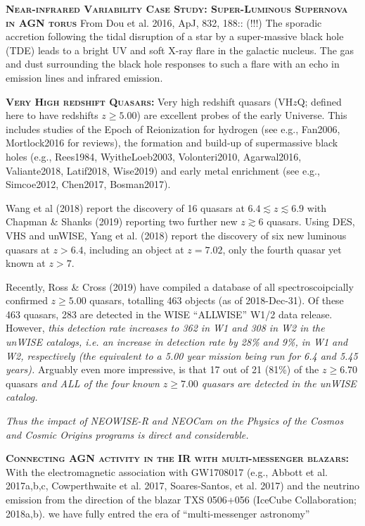 \documentclass[12pt]{article}
\begin{document}
\smallskip
\smallskip
\noindent
\textbf{\textsc{Near-infrared Variability Case Study: Super-Luminous Supernova in AGN torus}} 
From Dou et al. 2016, ApJ, 832, 188:: (!!!) 
The sporadic accretion following the tidal disruption of a star by a
super-massive black hole (TDE) leads to a bright UV and soft X-ray
flare in the galactic nucleus. The gas and dust surrounding the black
hole responses to such a flare with an echo in emission lines and
infrared emission.

\smallskip
\smallskip
\noindent
\textbf{\textsc{Very High redshift Quasars:}} 
Very high redshift quasars (VH$z$Q; defined here to have redshifts $z\geq5.00$) are excellent probes of the early Universe. This includes studies of the Epoch of Reionization for hydrogen (see e.g., Fan2006, Mortlock2016 for reviews), the formation and build-up of supermassive black holes (e.g., Rees1984, WyitheLoeb2003, Volonteri2010, Agarwal2016, Valiante2018, Latif2018, Wise2019) and early metal enrichment (see e.g., Simcoe2012, Chen2017, Bosman2017).

\smallskip
\smallskip
\noindent
Wang et al (2018) 
report the discovery of 16 quasars at $6.4\lesssim z \lesssim 6.9$ 
with Chapman \& Shanks (2019) reporting two further new $z\gtrsim6$ quasars. 
Using DES, VHS and unWISE, Yang et al. (2018) report the discovery of six new luminous quasars at $z > 6.4$, 
including an object at $z = 7.02$, only the fourth quasar yet known at $z > 7$. 

\smallskip
\smallskip
\noindent
Recently, Ross \& Cross (2019) have compiled a database of all 
spectroscoipcially confirmed $z\geq5.00$ quasars, totalling 463 objects (as of 
2018-Dec-31). Of these 463 quasars, 283 are detected in the WISE ``ALLWISE'' W1/2 
data release. However, {\it this detection rate increases to 362 in W1 and 308 in W2 
in the unWISE catalogs, i.e. an increase in detection rate by 28\% and 9\%, in W1 and W2, 
respectively (the equivalent to a 5.00 year mission being run for 6.4 and 5.45 years).}
Arguably even more impressive, is that 17  out of  21 (81\%) of the $z\geq6.70$
quasars {\it and ALL of the four known $z\geq7.00$ quasars are detected in the 
unWISE catalog.}

\smallskip
\smallskip
\noindent
{\it Thus the impact of NEOWISE-R and NEOCam on the Physics of the Cosmos and 
Cosmic Origins programs is direct and considerable.}


\smallskip
\smallskip
\noindent
\textbf{\textsc{Connecting AGN activity in the IR with multi-messenger blazars: }}
With the electromagnetic association with GW1708017 (e.g., Abbott et
al. 2017a,b,c, Cowperthwaite et al. 2017, Soares-Santos, et
al. 2017)
and the neutrino emission from the direction of the blazar TXS 0506+056 
(IceCube Collaboration; 2018a,b).
we have  fully entred the era of ``multi-messenger astronomy'' 
\end{document}
